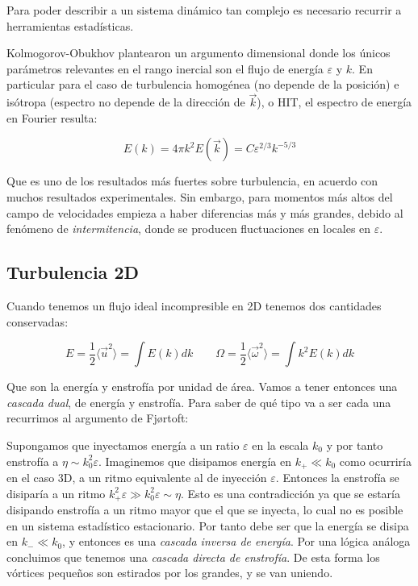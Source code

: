 Para poder describir a un sistema dinámico tan complejo es necesario recurrir a herramientas estadísticas. 


Kolmogorov-Obukhov plantearon un argumento dimensional donde los únicos parámetros relevantes en el rango inercial son el flujo de energía $\varepsilon$ y $k$. En particular para el caso de turbulencia homogénea (no depende de la posición) e isótropa (espectro no depende de la dirección de $\vec k$), o HIT, el espectro de energía en Fourier resulta:

\begin{equation}
	E(k) = 4\pi k^2E(\vec k) = C\varepsilon^{2/3}k^{-5/3}
	\label{eq:Kolmogorov_5_3}
\end{equation}

Que es uno de los resultados más fuertes sobre turbulencia, en acuerdo con muchos resultados experimentales. Sin embargo, para momentos más altos del campo de velocidades empieza a haber diferencias más y más grandes, debido al fenómeno de \textit{intermitencia}, donde se producen fluctuaciones en locales en $\varepsilon$.

\subsection*{Turbulencia 2D}
Cuando tenemos un flujo ideal incompresible en 2D tenemos dos cantidades conservadas:

\begin{equation}
	E = \frac{1}{2}\langle \vec u^2 \rangle = \int E(k) dk \qquad \Omega = \frac{1}{2} \langle \vec \omega^2 \rangle = \int k^2 E(k) dk
\end{equation}

Que son la energía y enstrofía por unidad de área. Vamos a tener entonces una \textit{cascada dual}, de energía y enstrofía. Para saber de qué tipo va a ser cada una recurrimos al argumento de Fjørtoft:

Supongamos que inyectamos energía a un ratio $\varepsilon$ en la escala $k_0$ y por tanto enstrofía a $\eta\sim k_0^2\varepsilon$. Imaginemos que disipamos energía en $k_+\ll k_0$ como ocurriría en el caso 3D, a un ritmo equivalente al de inyección $\varepsilon$. Entonces la enstrofía se disiparía a un ritmo $k_+^2\varepsilon\gg k_0^2\varepsilon\sim \eta$. Esto es una contradicción ya que se estaría disipando enstrofía a un ritmo mayor que el que se inyecta, lo cual no es posible en un sistema estadístico estacionario. Por tanto debe ser que la energía se disipa en $k_-\ll k_0$, y entonces es una \textit{cascada inversa de energía}. Por una lógica análoga concluimos que tenemos una \textit{cascada directa de enstrofía}. De esta forma los vórtices pequeños son estirados por los grandes, y se van uniendo.




